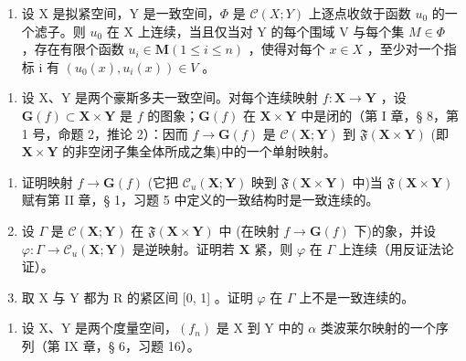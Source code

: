 \begin{enumerate}
\def\labelenumi{\alph{enumi})}
\setcounter{enumi}{1}
\tightlist
\item
  设 X 是拟紧空间，Y 是一致空间，\(\Phi\) 是 \(\mathcal{C}(X;Y)\) 上逐点收敛于函数 \(u_{0}\) 的一个滤子。则 \(u_{0}\) 在 X 上连续，当且仅当对 Y 的每个围域 V 与每个集 \(M\in\Phi\) ，存在有限个函数 \(u_{i}\in\mathbf{M}(1\leqslant i\leqslant n)\) ，使得对每个 \(x\in X\) ，至少对一个指标 i 有 \((u_{0}(x),u_{i}(x))\in V\) 。
\end{enumerate}

\begin{enumerate}
\def\labelenumi{\arabic{enumi})}
\setcounter{enumi}{6}
\tightlist
\item
  设 X、Y 是两个豪斯多夫一致空间。对每个连续映射 \(f: \mathbf{X} \to \mathbf{Y}\) ，设 \(\mathbf{G}(f) \subset \mathbf{X} \times \mathbf{Y}\) 是 \(f\) 的图象；\(\mathbf{G}(f)\) 在 \(\mathbf{X} \times \mathbf{Y}\) 中是闭的（第 I 章，§ 8，第 1 号，命题 2，推论 2）：因而 \(f \to \mathbf{G}(f)\) 是 \(\mathcal{C}(\mathbf{X}; \mathbf{Y})\) 到 \(\mathfrak{F}(\mathbf{X} \times \mathbf{Y})\) (即 \(\mathbf{X} \times \mathbf{Y}\) 的非空闭子集全体所成之集)中的一个单射映射。
\end{enumerate}

\begin{enumerate}
\def\labelenumi{\alph{enumi})}
\item
  证明映射 \(f \to \mathbf{G}(f)\) (它把 \(\mathcal{C}_u(\mathbf{X};\mathbf{Y})\) 映到 \(\mathfrak{F}(\mathbf{X}\times \mathbf{Y})\) 中)当 \(\mathfrak{F}(\mathbf{X}\times \mathbf{Y})\) 赋有第 II 章，§ 1，习题 5 中定义的一致结构时是一致连续的。
\item
  设 \(\Gamma\) 是 \(\mathcal{C}(\mathbf{X};\mathbf{Y})\) 在 \(\mathfrak{F}(\mathbf{X}\times \mathbf{Y})\) 中 (在映射 \(f\to \mathbf{G}(f)\) 下)的象，并设 \(\varphi :\Gamma \to \mathcal{C}_u(\mathbf{X};\mathbf{Y})\) 是逆映射。证明若 \(\mathbf{X}\) 紧，则 \(\varphi\) 在 \(\Gamma\) 上连续（用反证法论证）。
\item
  取 X 与 Y 都为 R 的紧区间 {[}0, 1{]} 。证明 \(\varphi\) 在 \(\Gamma\) 上不是一致连续的。
\end{enumerate}

\begin{enumerate}
\def\labelenumi{\arabic{enumi})}
\setcounter{enumi}{7}
\tightlist
\item
  设 X、Y 是两个度量空间，\((f_{n})\) 是 X 到 Y 中的 \(\alpha\) 类波莱尔映射的一个序列（第 IX 章，§ 6，习题 16）。
\end{enumerate}

